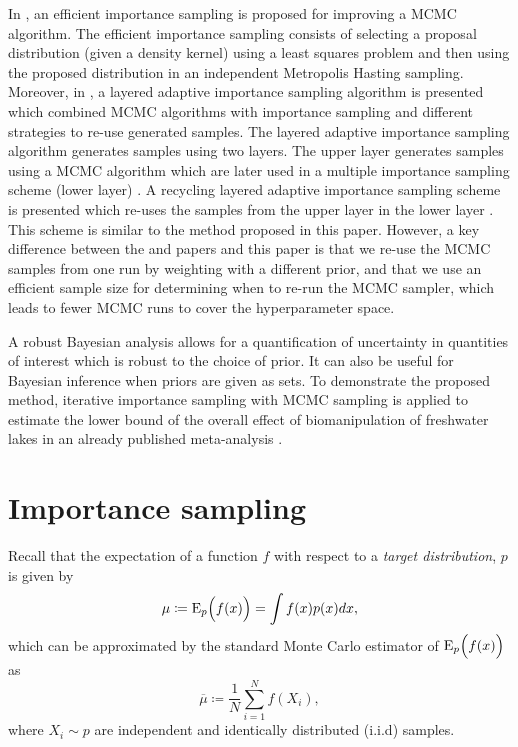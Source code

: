 \documentclass{amsart}
\theoremstyle{plain}%
\begin{document}
In \citep{Liesenfeld_2008}, an efficient importance sampling is proposed for improving a MCMC algorithm. The efficient importance sampling consists of selecting a proposal distribution (given a density kernel) using a least squares problem and then using the proposed distribution in an independent Metropolis Hasting sampling. 
Moreover, in \citep{Llorente_2021}, a layered adaptive importance sampling algorithm is presented which combined MCMC algorithms with importance sampling and different strategies to re-use generated samples. The layered adaptive importance sampling algorithm generates samples using two layers. The upper layer generates samples using a MCMC algorithm which are later used in a multiple importance sampling scheme (lower layer) \citep{Llorente_2021}. A recycling layered adaptive importance sampling scheme is presented which re-uses the samples from the upper layer in the lower layer \citep{Llorente_2021}. This scheme is similar to the method proposed in this paper. 
However, a key difference between the \citep{Liesenfeld_2008} and \citep{Llorente_2021} papers and this paper is that we re-use the MCMC samples from one run by weighting with a different prior, and that we use an efficient sample size for determining when to re-run the MCMC sampler, which leads to fewer MCMC runs to cover the hyperparameter space. 

A robust Bayesian analysis allows for a quantification of uncertainty in quantities of interest which is robust to the choice of prior. It can also be useful for Bayesian inference when priors are given as sets. To demonstrate the proposed method, iterative importance sampling with MCMC sampling is applied to estimate the lower bound of the overall effect of biomanipulation of freshwater lakes in an already published meta-analysis \citep{Bernes_2015}. 

\section{Importance sampling}
\label{sec:IS}

Recall that the expectation of a function $f$ with respect to a \emph{target distribution}, $p$ is given by
\begin{equation}
\mu \coloneqq
\mathrm{E}_p \Bigl(f(x)\Bigr) =  \displaystyle \int f(x)p(x) dx,
\end{equation}
which can be approximated by the standard Monte Carlo estimator of $\mathrm{E}_p \Bigl(f(x)\Bigr)$ as 
\begin{equation}
\overline{\mu} \coloneqq  \frac{1}{N}\displaystyle \sum_{i=1}^N  f(X_i), 
\label{Eq:Exp_MC}
\end{equation}
where  $X_i \sim p$ are independent and identically distributed (i.i.d) samples.
\end{document}
